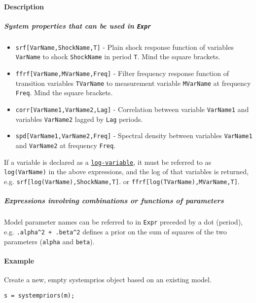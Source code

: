 \paragraph{Description}

\subparagraph{System properties that can be used in
\texttt{Expr}}

\begin{itemize}
\item
  \texttt{srf{[}VarName,ShockName,T{]}} - Plain shock response function
  of variables \texttt{VarName} to shock \texttt{ShockName} in period
  \texttt{T}. Mind the square brackets.
\item
  \texttt{ffrf{[}VarName,MVarName,Freq{]}} - Filter frequency response
  function of transition variables \texttt{TVarName} to measurement
  variable \texttt{MVarName} at frequency \texttt{Freq}. Mind the square
  brackets.
\item
  \texttt{corr{[}VarName1,VarName2,Lag{]}} - Correlation between
  variable \texttt{VarName1} and variables \texttt{VarName2} lagged by
  \texttt{Lag} periods.
\item
  \texttt{spd{[}VarName1,VarName2,Freq{]}} - Spectral density between
  variables \texttt{VarName1} and \texttt{VarName2} at frequency
  \texttt{Freq}.
\end{itemize}

If a variable is declared as a
\href{modellang/logvariables}{\texttt{log-variable}}, it must be
referred to as \texttt{log(VarName)} in the above expressions, and the
log of that variables is returned, e.g.
\texttt{srf{[}log(VarName),ShockName,T{]}}. or
\texttt{ffrf{[}log(TVarName),MVarName,T{]}}.

\subparagraph{Expressions involving combinations or functions of
parameters}

Model parameter names can be referred to in \texttt{Expr} preceded by a
dot (period), e.g. \texttt{.alpha\^{}2 + .beta\^{}2} defines a prior on
the sum of squares of the two parameters (\texttt{alpha} and
\texttt{beta}).

\paragraph{Example}

Create a new, empty systemprios object based on an existing model.

\begin{verbatim}
s = systempriors(m);
\end{verbatim}

